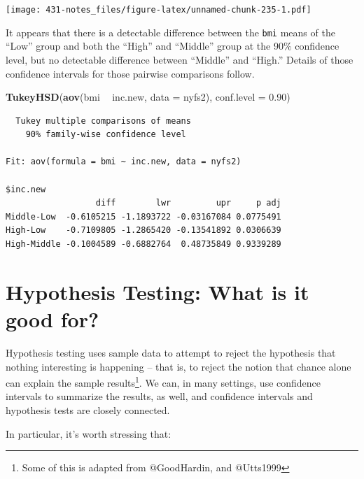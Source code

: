 \documentclass[
]{book}
\newenvironment{Shaded}{\begin{snugshade}}{\end{snugshade}}
\newcommand{\DataTypeTok}[1]{\textcolor[rgb]{0.13,0.29,0.53}{#1}}
\newcommand{\FloatTok}[1]{\textcolor[rgb]{0.00,0.00,0.81}{#1}}
\newcommand{\KeywordTok}[1]{\textcolor[rgb]{0.13,0.29,0.53}{\textbf{#1}}}
\newcommand{\NormalTok}[1]{#1}
\newcommand{\OperatorTok}[1]{\textcolor[rgb]{0.81,0.36,0.00}{\textbf{#1}}}
\newcommand{\StringTok}[1]{\textcolor[rgb]{0.31,0.60,0.02}{#1}}
\begin{document}
\texttt{[image: 431-notes\_files/figure-latex/unnamed-chunk-235-1.pdf]}

It appears that there is a detectable difference between the \texttt{bmi} means of the ``Low'' group and both the ``High'' and ``Middle'' group at the 90\% confidence level, but no detectable difference between ``Middle'' and ``High.'' Details of those confidence intervals for those pairwise comparisons follow.

\begin{Shaded}
\begin{Highlighting}[]
\KeywordTok{TukeyHSD}\NormalTok{(}\KeywordTok{aov}\NormalTok{(bmi }\OperatorTok{~}\StringTok{ }\NormalTok{inc.new, }\DataTypeTok{data =}\NormalTok{ nyfs2),}
                  \DataTypeTok{conf.level =} \FloatTok{0.90}\NormalTok{)}
\end{Highlighting}
\end{Shaded}

\begin{verbatim}
  Tukey multiple comparisons of means
    90% family-wise confidence level

Fit: aov(formula = bmi ~ inc.new, data = nyfs2)

$inc.new
                  diff        lwr         upr     p adj
Middle-Low  -0.6105215 -1.1893722 -0.03167084 0.0775491
High-Low    -0.7109805 -1.2865420 -0.13541892 0.0306639
High-Middle -0.1004589 -0.6882764  0.48735849 0.9339289
\end{verbatim}

\hypertarget{hypothesis-testing-what-is-it-good-for}{%
\chapter{Hypothesis Testing: What is it good for?}\label{hypothesis-testing-what-is-it-good-for}}

Hypothesis testing uses sample data to attempt to reject the hypothesis that nothing interesting is happening -- that is, to reject the notion that chance alone can explain the sample results\footnote{Some of this is adapted from @GoodHardin, and @Utts1999}. We can, in many settings, use confidence intervals to summarize the results, as well, and confidence intervals and hypothesis tests are closely connected.

In particular, it's worth stressing that:
\end{document}

